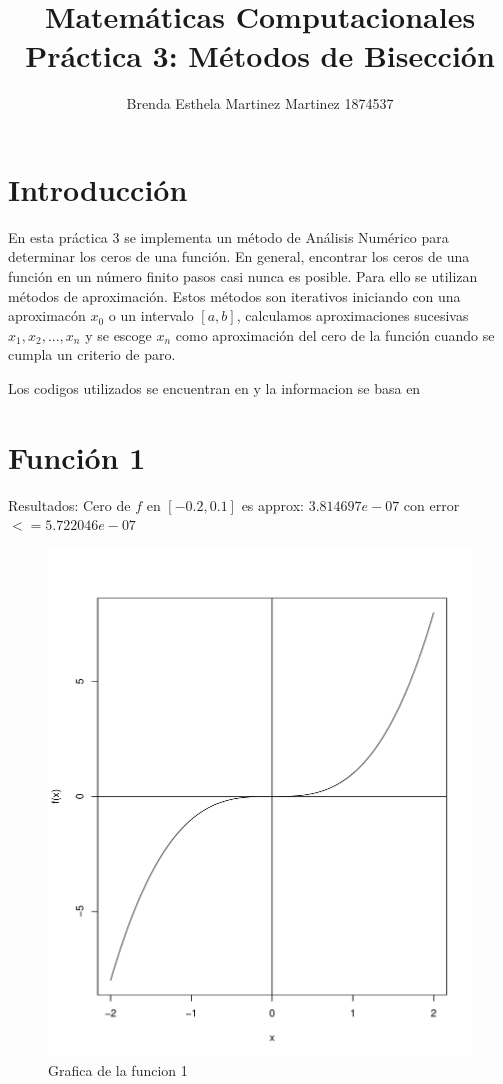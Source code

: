 \documentclass[12pt,a4paper]{article}
\title{Matemáticas Computacionales \\ Práctica 3: Métodos de Bisección}
\author{Brenda Esthela Martinez Martinez  1874537}
\begin{document}
\maketitle
\section{Introducci\'{o}n}\label{sec:intro}

En esta práctica 3 se implementa un método de Análisis Numérico para determinar los ceros de una función. En general, encontrar los ceros de una función en un número finito pasos casi nunca es posible. Para ello se utilizan métodos de aproximación. Estos métodos son iterativos iniciando con una aproximacón $ x_{0} $ o un intervalo $ [a, b] $, calculamos aproximaciones sucesivas $x _{1}, x_{2},..., x_{n} $ y se escoge $ x_{n} $ como aproximación del cero de la función cuando se cumpla un criterio de paro.

Los codigos utilizados se encuentran en \cite{repositorio} y la informacion se basa en \cite{METNUM}
\section{Función 1}\label{sec:FUN1}

Resultados: Cero de $ f$ en $[ -0.2 , 0.1 ]$ es approx: $ 3.814697e-07$ con error $<= 5.722046e-07 $

\begin{figure}
\centering
\includegraphics[scale=.8]{G1}
\caption{Grafica de la funcion 1}
\label{fig:G1}
\end{figure}
\end{document}
